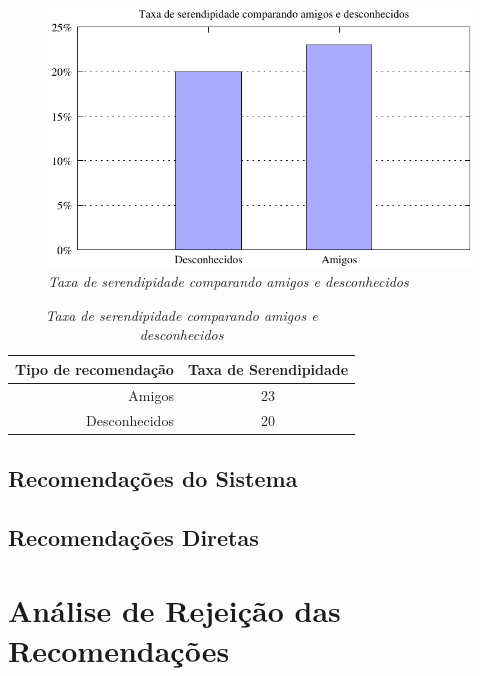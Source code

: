 \begin{figure}
    \centering
    \includegraphics[width=\textwidth]{imagens/grafico_serendipidade_diretas}
    \caption{\it Taxa de serendipidade comparando amigos e desconhecidos}
    \label{fig:serendipidade_diretas}
\end{figure}

\begin{table}
\centering
\begin{tabular}{|r|c|}
    \hline
    Tipo de recomendação & Taxa de Serendipidade \\
\hline 
Amigos & 23 \\
\hline 
Desconhecidos & 20 \\
\hline        
\end{tabular}
\caption{\it Taxa de serendipidade comparando amigos e desconhecidos}
\label{table:serendipidade_diretas}
\end{table}


 
\subsection{Recomendações do Sistema}

\subsection{Recomendações Diretas}


\section{Análise de Rejeição das Recomendações}
\label{sec:analise_de_rejeicao_das_recomendacoes}

